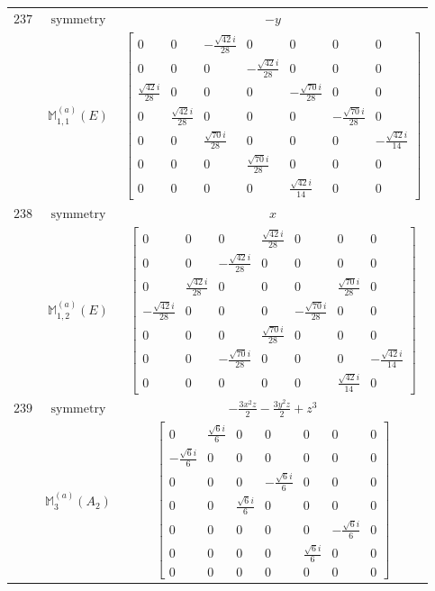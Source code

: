 \documentclass[fleqn,8pt,landscape]{jsarticle}
\begin{document}
\begin{longtable}{ccc}
$ 237 $ & $ \text{symmetry} $ & $ - y $ \\
$  $ & $ \mathbb{M}_{1,1}^{(a)}(E) $ & $ \begin{bmatrix} 0 & 0 & - \frac{\sqrt{42} i}{28} & 0 & 0 & 0 & 0 \\ 0 & 0 & 0 & - \frac{\sqrt{42} i}{28} & 0 & 0 & 0 \\ \frac{\sqrt{42} i}{28} & 0 & 0 & 0 & - \frac{\sqrt{70} i}{28} & 0 & 0 \\ 0 & \frac{\sqrt{42} i}{28} & 0 & 0 & 0 & - \frac{\sqrt{70} i}{28} & 0 \\ 0 & 0 & \frac{\sqrt{70} i}{28} & 0 & 0 & 0 & - \frac{\sqrt{42} i}{14} \\ 0 & 0 & 0 & \frac{\sqrt{70} i}{28} & 0 & 0 & 0 \\ 0 & 0 & 0 & 0 & \frac{\sqrt{42} i}{14} & 0 & 0 \end{bmatrix} $ \\ \hline
$ 238 $ & $ \text{symmetry} $ & $ x $ \\
$  $ & $ \mathbb{M}_{1,2}^{(a)}(E) $ & $ \begin{bmatrix} 0 & 0 & 0 & \frac{\sqrt{42} i}{28} & 0 & 0 & 0 \\ 0 & 0 & - \frac{\sqrt{42} i}{28} & 0 & 0 & 0 & 0 \\ 0 & \frac{\sqrt{42} i}{28} & 0 & 0 & 0 & \frac{\sqrt{70} i}{28} & 0 \\ - \frac{\sqrt{42} i}{28} & 0 & 0 & 0 & - \frac{\sqrt{70} i}{28} & 0 & 0 \\ 0 & 0 & 0 & \frac{\sqrt{70} i}{28} & 0 & 0 & 0 \\ 0 & 0 & - \frac{\sqrt{70} i}{28} & 0 & 0 & 0 & - \frac{\sqrt{42} i}{14} \\ 0 & 0 & 0 & 0 & 0 & \frac{\sqrt{42} i}{14} & 0 \end{bmatrix} $ \\ \hline
$ 239 $ & $ \text{symmetry} $ & $ - \frac{3 x^{2} z}{2} - \frac{3 y^{2} z}{2} + z^{3} $ \\
$  $ & $ \mathbb{M}_{3}^{(a)}(A_{2}) $ & $ \begin{bmatrix} 0 & \frac{\sqrt{6} i}{6} & 0 & 0 & 0 & 0 & 0 \\ - \frac{\sqrt{6} i}{6} & 0 & 0 & 0 & 0 & 0 & 0 \\ 0 & 0 & 0 & - \frac{\sqrt{6} i}{6} & 0 & 0 & 0 \\ 0 & 0 & \frac{\sqrt{6} i}{6} & 0 & 0 & 0 & 0 \\ 0 & 0 & 0 & 0 & 0 & - \frac{\sqrt{6} i}{6} & 0 \\ 0 & 0 & 0 & 0 & \frac{\sqrt{6} i}{6} & 0 & 0 \\ 0 & 0 & 0 & 0 & 0 & 0 & 0 \end{bmatrix} $ \\ \hline

\end{longtable}
\end{document}
